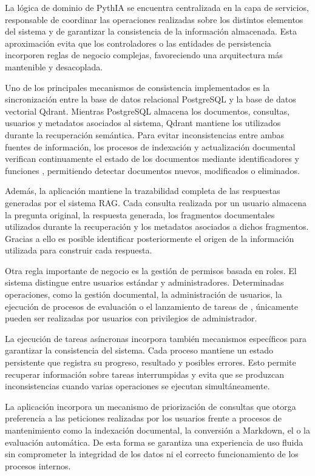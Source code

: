 La lógica de dominio de PythIA se encuentra centralizada en la capa de servicios, responsable de coordinar las operaciones realizadas sobre los distintos elementos del sistema y de garantizar la consistencia de la información almacenada. Esta aproximación evita que los controladores  o las entidades de persistencia incorporen reglas de negocio complejas, favoreciendo una arquitectura más mantenible y desacoplada.

Uno de los principales mecanismos de consistencia implementados es la sincronización entre la base de datos relacional PostgreSQL y la base de datos vectorial Qdrant. Mientras PostgreSQL almacena los documentos, consultas, usuarios y metadatos asociados al sistema, Qdrant mantiene los  utilizados durante la recuperación semántica. Para evitar inconsistencias entre ambas fuentes de información, los procesos de indexación y actualización documental verifican continuamente el estado de los documentos mediante identificadores y funciones , permitiendo detectar documentos nuevos, modificados o eliminados.

Además, la aplicación mantiene la trazabilidad completa de las respuestas generadas por el sistema RAG. Cada consulta realizada por un usuario almacena la pregunta original, la respuesta generada, los fragmentos documentales utilizados durante la recuperación y los metadatos asociados a dichos fragmentos. Gracias a ello es posible identificar posteriormente el origen de la información utilizada para construir cada respuesta.

Otra regla importante de negocio es la gestión de permisos basada en roles. El sistema distingue entre usuarios estándar y administradores. Determinadas operaciones, como la gestión documental, la administración de usuarios, la ejecución de procesos de evaluación o el lanzamiento de tareas de , únicamente pueden ser realizadas por usuarios con privilegios de administrador.

La ejecución de tareas asíncronas incorpora también mecanismos específicos para garantizar la consistencia del sistema. Cada proceso mantiene un estado persistente que registra su progreso, resultado y posibles errores. Esto permite recuperar información sobre tareas interrumpidas y evita que se produzcan inconsistencias cuando varias operaciones se ejecutan simultáneamente.

La aplicación incorpora un mecanismo de priorización de consultas que otorga preferencia a las peticiones realizadas por los usuarios frente a procesos de mantenimiento como la indexación documental, la conversión a Markdown, el  o la evaluación automática. De esta forma se garantiza una experiencia de uso fluida sin comprometer la integridad de los datos ni el correcto funcionamiento de los procesos internos.

